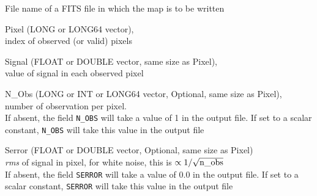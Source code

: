 \begin{qualifiers}
  \begin{qulist}{} %
 	\item[{File}] 
          name of a FITS file in which the map is to be written

 	\item[{Pixel}] 
	 (LONG or LONG64 vector), \\ index of observed (or valid) pixels

 	\item[{Signal}] 
	 (FLOAT or DOUBLE vector, same size as Pixel), \\ value of signal in each observed pixel

 	\item[{N\_Obs}] 
	 (LONG or INT or LONG64 vector, Optional, same size as Pixel), \\ number of
	 observation per pixel. \\
         If absent, the field {\tt N\_OBS} will take a value of 1 in the output file.
         If set to a scalar constant, {\tt N\_OBS} will take this value in the
	 output file

 	\item[{Serror}] 
	 (FLOAT or DOUBLE vector, Optional, same size as Pixel)\\ {\em rms} of signal in pixel, for white noise,
                   this is $\propto 1/\sqrt{{\rm n\_obs}}$ \\
         If absent, the field {\tt SERROR} will take a value of 0.0 in the output file.
         If set to a scalar constant, {\tt SERROR} will take this value in the
	 output file

  \end{qulist}
\end{qualifiers}

